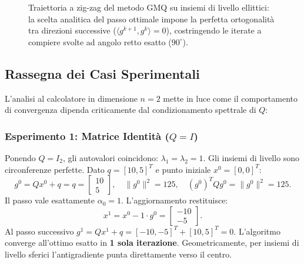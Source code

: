 \begin{figure}[H]
{%
}
\caption{Traiettoria a zig-zag del metodo GMQ su insiemi di livello ellittici: la scelta analitica del passo ottimale impone la perfetta ortogonalit\`a tra direzioni successive ($\langle g^{k+1}, g^k \rangle = 0$), costringendo le iterate a compiere svolte ad angolo retto esatto ($90^\circ$).}
\label{fig:zig-zag-gmq}
\end{figure}

\subsection{Rassegna dei Casi Sperimentali}
L'analisi al calcolatore in dimensione $n = 2$ mette in luce come il comportamento di convergenza dipenda criticamente dal condizionamento spettrale di $Q$:

\subsubsection{Esperimento 1: Matrice Identit\`a ($Q = I$)}
Ponendo $Q = I_2$, gli autovalori coincidono: $\lambda_1 = \lambda_2 = 1$. Gli insiemi di livello sono circonferenze perfette.
Dato $q = [10, 5]^T$ e punto iniziale $x^0 = [0, 0]^T$:
\begin{equation}
    g^0 = Q x^0 + q = q = \begin{bmatrix} 10 \\ 5 \end{bmatrix}, \quad \|g^0\|^2 = 125, \quad (g^0)^T Q g^0 = \|g^0\|^2 = 125.
\end{equation}
Il passo vale esattamente $\alpha_0 = 1$. L'aggiornamento restituisce:
\begin{equation}
    x^1 = x^0 - 1 \cdot g^0 = \begin{bmatrix} -10 \\ -5 \end{bmatrix}.
\end{equation}
Al passo successivo $g^1 = Q x^1 + q = [-10, -5]^T + [10, 5]^T = 0$.
L'algoritmo converge all'ottimo esatto in \textbf{1 sola iterazione}. Geometricamente, per insiemi di livello sferici l'antigradiente punta direttamente verso il centro.

